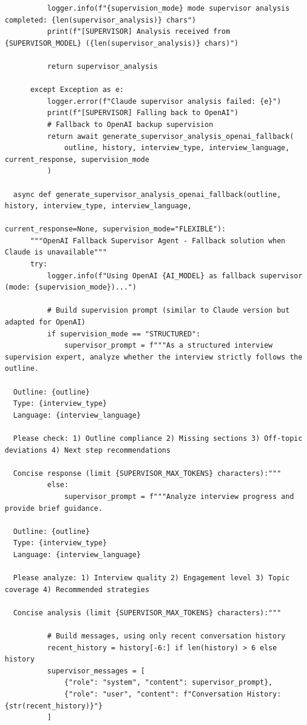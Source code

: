 \documentclass[sigchi,nonacm,manuscript]{acmart}
\begin{document}
\begin{lstlisting}
          logger.info(f"{supervision_mode} mode supervisor analysis completed: {len(supervisor_analysis)} chars")
          print(f"[SUPERVISOR] Analysis received from {SUPERVISOR_MODEL} ({len(supervisor_analysis)} chars)")
          
          return supervisor_analysis

      except Exception as e:
          logger.error(f"Claude supervisor analysis failed: {e}")
          print(f"[SUPERVISOR] Falling back to OpenAI")
          # Fallback to OpenAI backup supervision
          return await generate_supervisor_analysis_openai_fallback(
              outline, history, interview_type, interview_language, current_response, supervision_mode
          )

  async def generate_supervisor_analysis_openai_fallback(outline, history, interview_type, interview_language, 
                                                      current_response=None, supervision_mode="FLEXIBLE"):
      """OpenAI Fallback Supervisor Agent - Fallback solution when Claude is unavailable"""
      try:
          logger.info(f"Using OpenAI {AI_MODEL} as fallback supervisor (mode: {supervision_mode})...")
          
          # Build supervision prompt (similar to Claude version but adapted for OpenAI)
          if supervision_mode == "STRUCTURED":
              supervisor_prompt = f"""As a structured interview supervision expert, analyze whether the interview strictly follows the outline.

  Outline: {outline}
  Type: {interview_type}
  Language: {interview_language}

  Please check: 1) Outline compliance 2) Missing sections 3) Off-topic deviations 4) Next step recommendations

  Concise response (limit {SUPERVISOR_MAX_TOKENS} characters):"""
          else:
              supervisor_prompt = f"""Analyze interview progress and provide brief guidance.

  Outline: {outline}
  Type: {interview_type}  
  Language: {interview_language}

  Please analyze: 1) Interview quality 2) Engagement level 3) Topic coverage 4) Recommended strategies

  Concise analysis (limit {SUPERVISOR_MAX_TOKENS} characters):"""
          
          # Build messages, using only recent conversation history
          recent_history = history[-6:] if len(history) > 6 else history
          supervisor_messages = [
              {"role": "system", "content": supervisor_prompt},
              {"role": "user", "content": f"Conversation History: {str(recent_history)}"}
          ]
          

\end{lstlisting}
\end{document}
